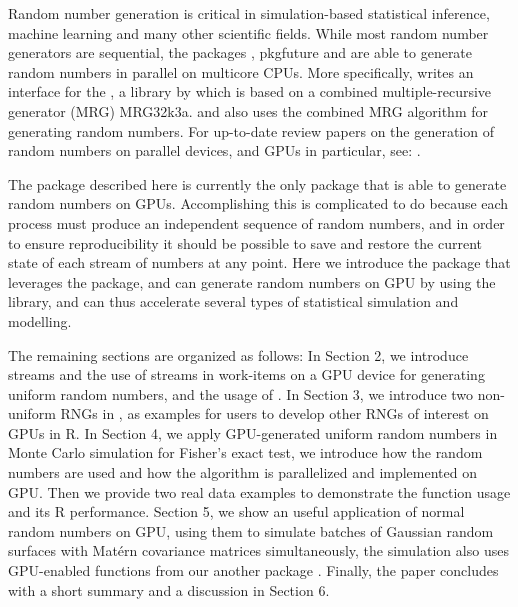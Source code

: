 \documentclass[article,nojss]{jss}\usepackage[]{graphicx}\usepackage[]{color}
\newcommand{\fct}[1]{\code{#1()}}
\begin{document}
\begin{leftbar}
Random number generation is critical in simulation-based statistical inference, machine learning and many other scientific fields. While most random number generators are sequential, the  packages , pkg{future} \citep*{future1.19.1} and  \citep{sevcikova2015package} are able to generate random numbers in parallel on multicore CPUs. More specifically,  writes an interface for the , a  library by \cite{l2002object} which is based on a combined multiple-recursive generator (MRG) MRG32k3a.  and  also uses the combined MRG algorithm for generating random numbers. For up-to-date review papers on the generation of random numbers on parallel devices, and GPUs in particular, see:  \cite{rLEC15a,rLEC17p,rLEC21a}.


The  package described here is currently the only  package that is able to generate random numbers on GPUs. Accomplishing this is complicated to do because each process must produce an independent sequence of random numbers, and in order to ensure reproducibility it should be possible to save and restore the current state of each stream of numbers at any point.  Here we introduce the  package  that leverages the  package, and can generate random numbers on GPU by using the  \citep{l2015clrng} library, and can thus accelerate several types of statistical simulation and modelling.



The remaining sections are organized as follows:
In Section 2, we introduce streams and the use of streams in work-items on a GPU device for generating uniform random numbers, and the usage of \fct{clrng::runif}.
In Section 3, we introduce two non-uniform RNGs in , as examples for users to develop other RNGs of interest on GPUs in R.
In Section 4, we apply GPU-generated uniform random numbers in Monte Carlo simulation for Fisher’s exact test, we introduce how the random numbers are used and how the algorithm is parallelized and implemented on GPU. Then we provide two real data examples to demonstrate the function usage and its R performance.
Section 5, we show an useful application of normal random numbers on GPU, using them to simulate batches of Gaussian random surfaces with Mat\'ern covariance matrices simultaneously, the simulation also uses GPU-enabled functions from our another package .
Finally, the paper concludes with a short summary and a discussion in Section 6.



\end{leftbar}
\end{document}
